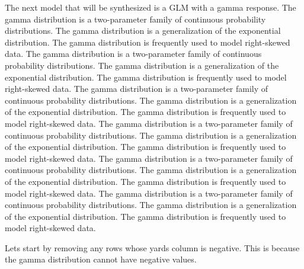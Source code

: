 \documentclass[
  super,
  preprint,
  3p]{elsarticle}
\newenvironment{Shaded}{\begin{snugshade}}{\end{snugshade}}
\newcommand{\CommentTok}[1]{\textcolor[rgb]{0.37,0.37,0.37}{#1}}
\newcommand{\DecValTok}[1]{\textcolor[rgb]{0.68,0.00,0.00}{#1}}
\newcommand{\FloatTok}[1]{\textcolor[rgb]{0.68,0.00,0.00}{#1}}
\newcommand{\NormalTok}[1]{\textcolor[rgb]{0.00,0.23,0.31}{#1}}
\newcommand{\OtherTok}[1]{\textcolor[rgb]{0.00,0.23,0.31}{#1}}
\newcommand{\SpecialCharTok}[1]{\textcolor[rgb]{0.37,0.37,0.37}{#1}}
\begin{document}
\begin{Shaded}
\end{Shaded}

The next model that will be synthesized is a GLM with a gamma response.
The gamma distribution is a two-parameter family of continuous
probability distributions. The gamma distribution is a generalization of
the exponential distribution. The gamma distribution is frequently used
to model right-skewed data. The gamma distribution is a two-parameter
family of continuous probability distributions. The gamma distribution
is a generalization of the exponential distribution. The gamma
distribution is frequently used to model right-skewed data. The gamma
distribution is a two-parameter family of continuous probability
distributions. The gamma distribution is a generalization of the
exponential distribution. The gamma distribution is frequently used to
model right-skewed data. The gamma distribution is a two-parameter
family of continuous probability distributions. The gamma distribution
is a generalization of the exponential distribution. The gamma
distribution is frequently used to model right-skewed data. The gamma
distribution is a two-parameter family of continuous probability
distributions. The gamma distribution is a generalization of the
exponential distribution. The gamma distribution is frequently used to
model right-skewed data. The gamma distribution is a two-parameter
family of continuous probability distributions. The gamma distribution
is a generalization of the exponential distribution. The gamma
distribution is frequently used to model right-skewed data.

Lets start by removing any rows whose yards column is negative. This is
because the gamma distribution cannot have negative values.

\begin{Shaded}
\end{Shaded}
\end{document}
